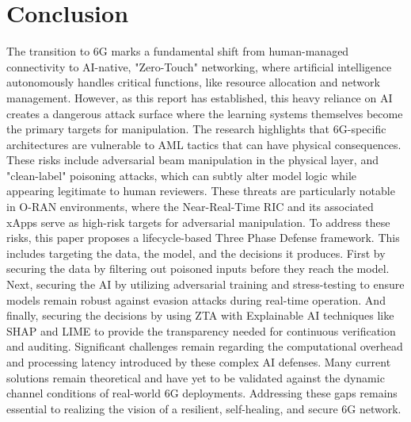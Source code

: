\documentclass[letterpaper]{article} %
\begin{document}
\section{Conclusion}
The transition to 6G marks a fundamental shift from human-managed connectivity to AI-native, "Zero-Touch" networking, where artificial intelligence autonomously handles critical functions, like resource allocation and network management\cite{Suomalainen_2025}. However, as this report has established, this heavy reliance on AI creates a dangerous attack surface where the learning systems themselves become the primary targets for manipulation\cite{Kumar_Dutta_Vamsi_Sankararao_Varri_Puthal_2026}. 
The research highlights that 6G-specific architectures are vulnerable to AML tactics that can have physical consequences. These risks include adversarial beam manipulation in the physical layer, and "clean-label" poisoning attacks, which can subtly alter model logic while appearing legitimate to human reviewers. These threats are particularly notable in O-RAN environments, where the Near-Real-Time RIC and its associated xApps serve as high-risk targets for adversarial manipulation\cite{Catak_Catak_Moldsvor_2021}.
To address these risks, this paper proposes a lifecycle-based Three Phase Defense framework. This includes targeting the data, the model, and the decisions it produces. First by securing the data by filtering out poisoned inputs before they reach the model. Next, securing the AI by utilizing adversarial training and stress-testing to ensure models remain robust against evasion attacks during real-time operation. And finally, securing the decisions by using ZTA with Explainable AI techniques like SHAP and LIME to provide the transparency needed for continuous verification and auditing\cite{Kumar_Dutta_Vamsi_Sankararao_Varri_Puthal_2026}.
Significant challenges remain regarding the computational overhead and processing latency introduced by these complex AI defenses\cite{Chen_Zhang_Zhang_Wang_Liu_2021}. Many current solutions remain theoretical and have yet to be validated against the dynamic channel conditions of real-world 6G deployments. Addressing these gaps remains essential to realizing the vision of a resilient, self-healing, and secure 6G network.







\end{document}
